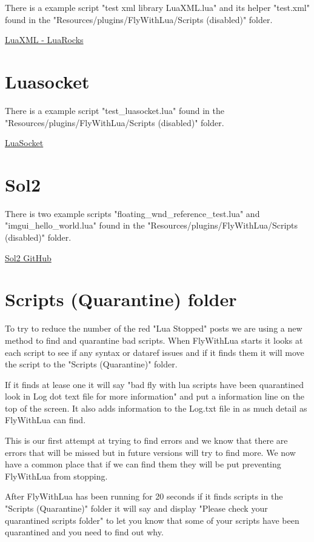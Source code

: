 \documentclass[11pt,parskip=half,a4paper]{scrartcl}
\begin{document}
There is a example script "test xml library LuaXML.lua" and its helper "test.xml" found in the "Resources/plugins/FlyWithLua/Scripts (disabled)" folder.

\href{https://luarocks.org/modules/djerius/luaxml}{LuaXML - LuaRocks}

\section{Luasocket}

There is a example script "test\_luasocket.lua"  found in the "Resources/plugins/FlyWithLua/Scripts (disabled)" folder.

\href{https://github.com/diegonehab/luasocket}{LuaSocket}

\section{Sol2}

There is two example scripts "floating\_wnd\_reference\_test.lua" and "imgui\_hello\_world.lua" found in the "Resources/plugins/FlyWithLua/Scripts (disabled)" folder.

\href{https://github.com/ThePhD/sol2}{Sol2 GitHub}


\newpage
\section{Scripts (Quarantine) folder}

To try to reduce the number of the red "Lua Stopped" posts we are using a new method to find and quarantine bad scripts. When FlyWithLua starts it looks at each script to see if any syntax or dataref issues and if it finds them it will move the script to the "Scripts (Quarantine)" folder.

If it finds at lease one it will say "bad fly with lua scripts have been quarantined look in Log dot text file for more information" and put a information line on the top of the screen. It also adds information to the Log.txt file in as much detail as FlyWithLua can find.

This is our first attempt at trying to find errors and we know that there are errors that will be missed but in future versions will try to find more. We now have a common place that if we can find them they will be put preventing FlyWithLua from stopping.

After FlyWithLua has been running for 20 seconds if it finds scripts in the "Scripts (Quarantine)" folder it will say and display "Please check your quarantined scripts folder" to let you know that some of your scripts have been quarantined and you need to find out why.
\end{document}
